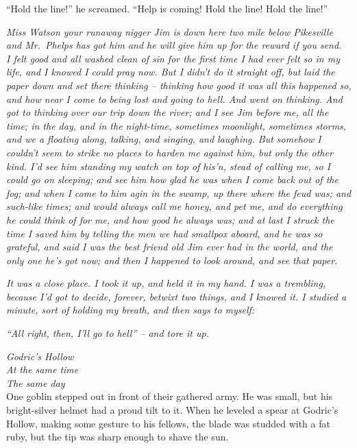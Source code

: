 ``Hold the line!'' he screamed. ``Help is coming! Hold the line! Hold
the line!''

\mybreak

\emph{Miss Watson your runaway nigger Jim is down here two mile below
Pikesville and Mr.~Phelps has got him and he will give him up for the
reward if you send.} \\

\emph{I felt good and all washed clean of sin for the first time I had
ever felt so in my life, and I knowed I could pray now. But I didn't do
it straight off, but laid the paper down and set there thinking --
thinking how good it was all this happened so, and how near I come to
being lost and going to hell. And went on thinking. And got to thinking
over our trip down the river; and I see Jim before me, all the time; in
the day, and in the night-time, sometimes moonlight, sometimes storms,
and we a floating along, talking, and singing, and laughing. But somehow
I couldn't seem to strike no places to harden me against him, but only
the other kind. I'd see him standing my watch on top of his'n, stead of
calling me, so I could go on sleeping; and see him how glad he was when
I come back out of the fog; and when I come to him agin in the swamp, up
there where the feud was; and such-like times; and would always call me
honey, and pet me, and do everything he could think of for me, and how
good he always was; and at last I struck the time I saved him by telling
the men we had smallpox aboard, and he was so grateful, and said I was
the best friend old Jim ever had in the world, and the only one he's got
now; and then I happened to look around, and see that paper.}

\emph{It was a close place. I took it up, and held it in my hand. I was
a trembling, because I'd got to decide, forever, betwixt two things, and
I knowed it. I studied a minute, sort of holding my breath, and then
says to myself:}

\emph{``All right, then, I'll go to hell'' -- and tore it up.}


\mybreak

\emph{Godric's Hollow}\\
\emph{At the same time}\\
\emph{The same day}\\

One goblin stepped out in front of their gathered army. He was small,
but his bright-silver helmet had a proud tilt to it. When he leveled a
spear at Godric's Hollow, making some gesture to his fellows, the blade
was studded with a fat ruby, but the tip was sharp enough to shave the
sun.

